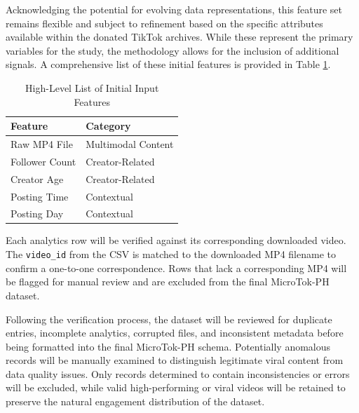 Acknowledging the potential for evolving data representations, this feature set remains flexible and subject to refinement based on the specific attributes available within the donated TikTok archives. While these represent the primary variables for the study, the methodology allows for the inclusion of additional signals. A comprehensive list of these initial features is provided in Table \ref{tab:feature_list}.

\begin{table}[H]
    \centering
    \begin{tabular}{ll}
        \toprule
        \textbf{Feature}  & \textbf{Category} \\
        \midrule
        Raw MP4 File  & Multimodal Content \\
        Follower Count  & Creator-Related \\
        Creator Age  & Creator-Related \\
        Posting Time  & Contextual \\
        Posting Day  & Contextual \\
        \bottomrule
    \end{tabular}
    \caption{High-Level List of Initial Input Features}
    \label{tab:feature_list}
\end{table}

Each analytics row will be verified against its corresponding downloaded video. The \texttt{video\_id} from the CSV is matched to the downloaded MP4 filename to confirm a one-to-one correspondence. Rows that lack a corresponding MP4 will be flagged for manual review and are excluded from the final MicroTok-PH dataset.

Following the verification process, the dataset will be reviewed for duplicate entries, incomplete analytics, corrupted files, and inconsistent metadata before being formatted into the final MicroTok-PH schema. Potentially anomalous records will be manually examined to distinguish legitimate viral content from data quality issues. Only records determined to contain inconsistencies or errors will be excluded, while valid high-performing or viral videos will be retained to preserve the natural engagement distribution of the dataset.


